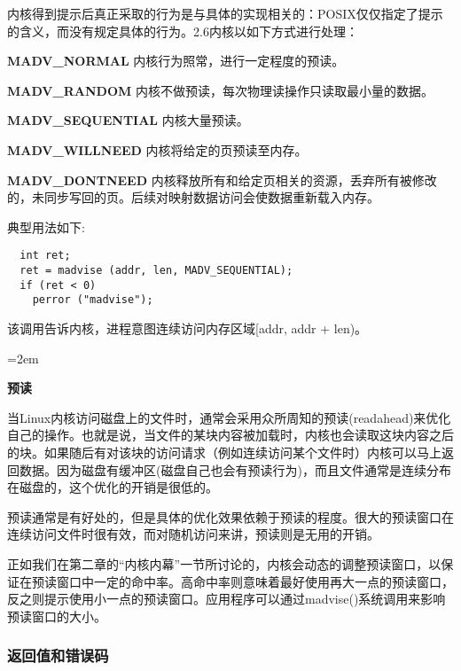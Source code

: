 内核得到提示后真正采取的行为是与具体的实现相关的：POSIX仅仅指定了提示的含义，而没有规定具体的行为。2.6内核以如下方式进行处理：

\begin{eqlist*}
\item[\textbf{MADV\_NORMAL}] 内核行为照常，进行一定程度的预读。 
\item[\textbf{MADV\_RANDOM}] 内核不做预读，每次物理读操作只读取最小量的数据。
\item[\textbf{MADV\_SEQUENTIAL}] 内核大量预读。
\item[\textbf{MADV\_WILLNEED}] 内核将给定的页预读至内存。
\item[\textbf{MADV\_DONTNEED}] 内核释放所有和给定页相关的资源，丢弃所有被修改的，未同步写回的页。后续对映射数据访问会使数据重新载入内存。
\end{eqlist*}

典型用法如下:

\begin{lstlisting}
  int ret;
  ret = madvise (addr, len, MADV_SEQUENTIAL);
  if (ret < 0)
    perror ("madvise");
\end{lstlisting}

该调用告诉内核，进程意图连续访问内存区域[addr, addr + len)。

\begin{center}
\begin{boxedminipage}{\textwidth}
\parindent=2em
\begin{center}\textbf{预读}\end{center}

当Linux内核访问磁盘上的文件时，通常会采用众所周知的预读(readahead)来优化自己的操作。也就是说，当文件的某块内容被加载时，内核也会读取这块内容之后的块。如果随后有对该块的访问请求（例如连续访问某个文件时）内核可以马上返回数据。因为磁盘有缓冲区(磁盘自己也会有预读行为)，而且文件通常是连续分布在磁盘的，这个优化的开销是很低的。

预读通常是有好处的，但是具体的优化效果依赖于预读的程度。很大的预读窗口在连续访问文件时很有效，而对随机访问来讲，预读则是无用的开销。

正如我们在第二章的“内核内幕”一节所讨论的，内核会动态的调整预读窗口，以保证在预读窗口中一定的命中率。高命中率则意味着最好使用再大一点的预读窗口，反之则提示使用小一点的预读窗口。应用程序可以通过madvise()系统调用来影响预读窗口的大小。
\end{boxedminipage}
\end{center}

\subsubsection{返回值和错误码}


